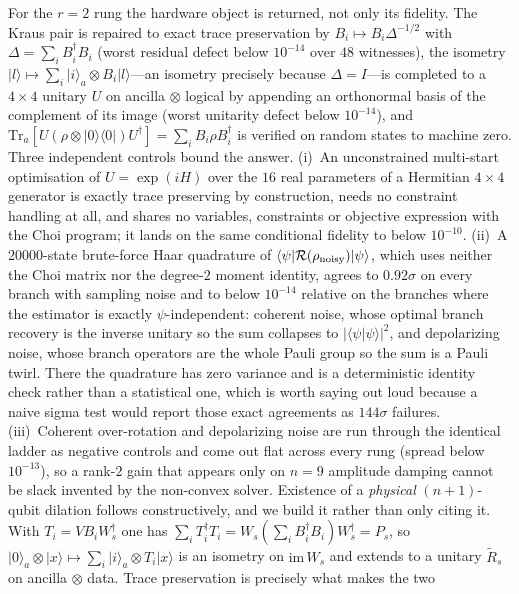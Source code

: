 \documentclass[aps,prxquantum,reprint,superscriptaddress]{revtex4-2}
\newcommand{\ket}[1]{\lvert #1\rangle}
\newcommand{\bra}[1]{\langle #1\rvert}
\begin{document}
For the $r{=}2$ rung the hardware object is returned, not only its fidelity. The
Kraus pair is repaired to exact trace preservation by $B_i\mapsto B_i\Delta^{-1/2}$
with $\Delta=\sum_i B_i^\dagger B_i$ (worst residual defect below $10^{-14}$
over $48$ witnesses), the
isometry $\ket l\mapsto\sum_i\ket i_a\otimes B_i\ket l$---an isometry precisely
because $\Delta=I$---is completed to a $4\times4$ unitary $U$ on
ancilla$\,\otimes\,$logical by appending an orthonormal basis of the complement of
its image (worst unitarity defect below $10^{-14}$), and
$\mathrm{Tr}_a\!\left[U(\rho\otimes\ket0\bra0)U^\dagger\right]=\sum_i B_i\rho
B_i^\dagger$ is verified on random states to machine zero. Three independent
controls bound the answer. (i)~An unconstrained multi-start optimisation of
$U=\exp(iH)$ over the $16$ real parameters of a Hermitian $4\times4$ generator is
exactly trace preserving by construction, needs no constraint handling at all, and
shares no variables, constraints or objective expression with the Choi program; it
lands on the same conditional fidelity to below $10^{-10}$. (ii)~A
$20000$-state brute-force Haar quadrature of
$\langle\psi|\mathcal R(\rho_{\rm noisy})|\psi\rangle$, which uses neither the
Choi matrix nor the degree-$2$ moment identity, agrees to $0.92\sigma$ on every
branch with sampling noise and to below $10^{-14}$ relative on the branches
where the estimator is exactly $\psi$-independent: coherent noise, whose optimal
branch recovery is the inverse unitary so the sum collapses to
$|\langle\psi|\psi\rangle|^2$, and depolarizing noise, whose branch operators are
the whole Pauli group so the sum is a Pauli twirl. There the quadrature has zero
variance and is a deterministic identity check rather than a statistical one,
which is worth saying out loud because a naive sigma test would report those exact
agreements as $144\sigma$ failures. (iii)~Coherent over-rotation and
depolarizing noise are run through the identical ladder as negative controls and
come out flat across every rung (spread below $10^{-13}$), so a rank-$2$ gain
that appears only on $n=9$
amplitude damping cannot be slack invented by the non-convex solver. Existence of
a \emph{physical} $(n{+}1)$-qubit dilation follows constructively, and we build it
rather than only citing it. With $T_i=VB_iW_s^\dagger$ one has
$\sum_i T_i^\dagger T_i=W_s(\sum_iB_i^\dagger B_i)W_s^\dagger=P_s$, so
$\ket0_a\otimes\ket x\mapsto\sum_i\ket i_a\otimes T_i\ket x$ is an isometry on
$\mathrm{im}\,W_s$ and extends to a unitary $\tilde R_s$ on
ancilla$\,\otimes\,$data. Trace preservation is precisely what makes the two
\end{document}
